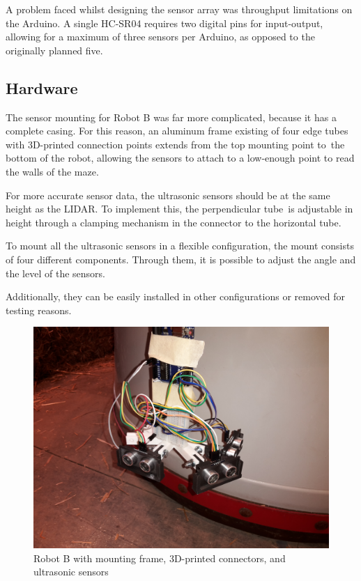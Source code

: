 \documentclass[11pt]{article}
\begin{document}
	A problem faced whilst designing the sensor array was throughput limitations on the Arduino. A single HC-SR04 requires two digital pins for input-output, allowing for a maximum of three sensors per Arduino, as opposed to the originally planned five. \newline
	
	\subsection{Hardware}
	The sensor mounting for Robot B was far more complicated, because it has a complete casing. For this reason, an aluminum frame existing of four edge tubes with 3D-printed connection points extends from the top mounting point to the bottom of the robot, allowing the sensors to attach to a low-enough point to read the walls of the maze.\newline
	
	For more accurate sensor data, the ultrasonic sensors should be at the same height as the LIDAR. To implement this, the perpendicular tube is adjustable in height through a clamping mechanism in the connector to the horizontal tube. \newline
	
	To mount all the ultrasonic sensors in a flexible configuration, the mount consists of four different components. Through them, it is possible to adjust the angle and the level of the sensors. \newline
	
	Additionally, they can be easily installed in other configurations or removed for testing reasons.
	
	\begin{figure}[h!]
		\centering
		\includegraphics[scale=0.1]{ultrasonic_mount}
		\caption{Robot B with mounting frame, 3D-printed connectors, and ultrasonic sensors}
	\end{figure}
	
\end{document}
